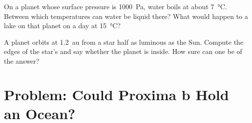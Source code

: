 \begin{exercise}[$\star\star\star$]\label{exo:g10:habitable-planet:14}
On a planet whose surface pressure is \qty{1000}{Pa}, water boils at about
\qty{7}{\degreeCelsius}. Between which temperatures can water be liquid
there? What would happen to a lake on that planet on a day at
\qty{15}{\degreeCelsius}?
\end{exercise}

\begin{exercise}[$\star\star\star$]\label{exo:g10:habitable-planet:15}
A planet orbits at \qty{1.2}{au} from a star half as luminous as the Sun.
Compute the edges of the star's  and say whether the planet is
inside. How sure can one be of the answer?
\end{exercise}

\section{Problem: Could Proxima b Hold an Ocean?}

